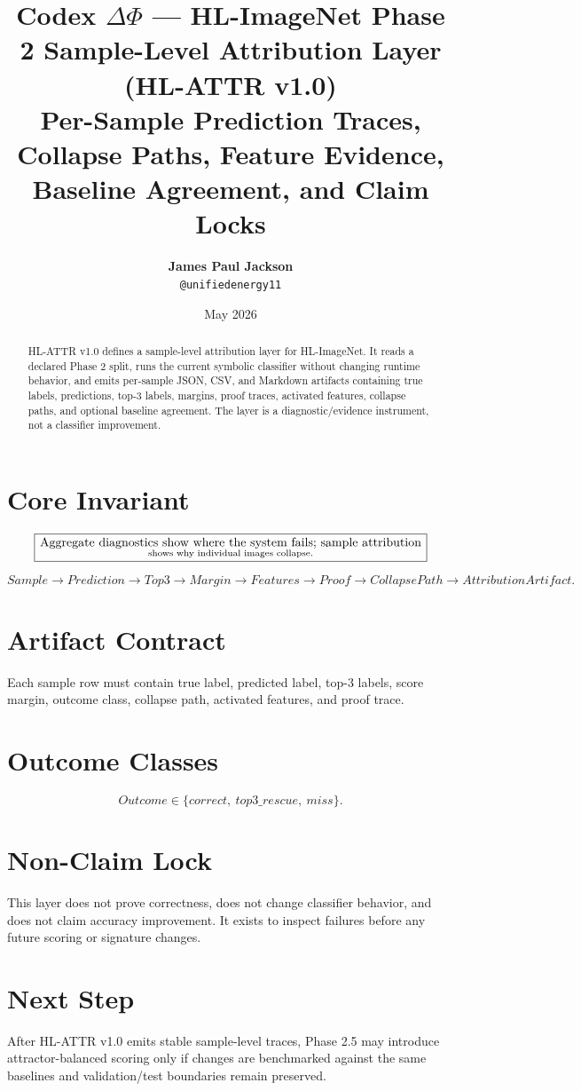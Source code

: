 \documentclass[12pt]{article}
\title{\textbf{Codex $\Delta\Phi$ — HL-ImageNet Phase 2 Sample-Level Attribution Layer (HL-ATTR v1.0)}\\
\large Per-Sample Prediction Traces, Collapse Paths, Feature Evidence, Baseline Agreement, and Claim Locks}
\author{\textbf{James Paul Jackson}\\ \small \texttt{@unifiedenergy11}}
\date{May 2026}
\begin{document}
\maketitle

\begin{abstract}
HL-ATTR v1.0 defines a sample-level attribution layer for HL-ImageNet. It reads
a declared Phase 2 split, runs the current symbolic classifier without changing
runtime behavior, and emits per-sample JSON, CSV, and Markdown artifacts
containing true labels, predictions, top-3 labels, margins, proof traces,
activated features, collapse paths, and optional baseline agreement. The layer
is a diagnostic/evidence instrument, not a classifier improvement.
\end{abstract}

\section{Core Invariant}

\[
\boxed{
\text{Aggregate diagnostics show where the system fails; sample attribution}
\atop
\text{shows why individual images collapse.}
}
\]

\[
Sample
\rightarrow Prediction
\rightarrow Top3
\rightarrow Margin
\rightarrow Features
\rightarrow Proof
\rightarrow CollapsePath
\rightarrow AttributionArtifact.
\]

\section{Artifact Contract}

Each sample row must contain true label, predicted label, top-3 labels, score
margin, outcome class, collapse path, activated features, and proof trace.

\section{Outcome Classes}

\[
Outcome \in \{correct,\ top3\_rescue,\ miss\}.
\]

\section{Non-Claim Lock}

This layer does not prove correctness, does not change classifier behavior, and
does not claim accuracy improvement. It exists to inspect failures before any
future scoring or signature changes.

\section{Next Step}

After HL-ATTR v1.0 emits stable sample-level traces, Phase 2.5 may introduce
attractor-balanced scoring only if changes are benchmarked against the same
baselines and validation/test boundaries remain preserved.
\end{document}
